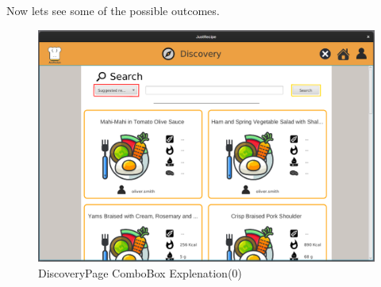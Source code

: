\documentclass[a4paper]{report}
\begin{document}
\noindent Now lets see some of the possible outcomes.
\begin{figure}[htpb]
	\centering
	\includegraphics[scale=0.37]{img/user_manual/combobox0.png}
	\caption{DiscoveryPage ComboBox Explenation(0)}
\end{figure}
\end{document}
